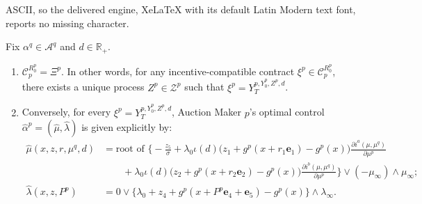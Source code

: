 \documentclass[10pt,a4paper]{amsart}
\begin{document}
ASCII, so the delivered engine, XeLaTeX with its default Latin Modern text font, reports no missing character.
\begin{lemma} \label{lemma:trader}
Fix $\alpha^q \in \mathcal{A}^q$ and $d \in \mathbb{R}_+$.

\begin{enumerate}
    \item $\mathcal{C}^{R_0^p}_p = \Xi^p$. In other words, for any incentive-compatible contract $\xi^p \in \mathcal{C}^{R_0^p}_p$, there exists a unique process $Z^p \in \mathcal{Z}^p$ such that $\xi^p = Y_T^{p,Y_0^p,Z^p,d}$.
    \item Conversely, for every $\xi^p = Y_T^{p,Y_0^p,Z^p,d}$, Auction Maker $p$'s optimal control $\hat{\alpha}^p = (\hat{\mu}, \hat{\lambda})$ is given explicitly by:
    \begin{align*}
        \hat{\mu}(x,z,r,\mu^{q},d) &= \text{root of } \Bigg\{ -\frac{z_5}{\sigma} + \lambda_0 \iota(d) \big(z_1 + g^p(x + r_1\mathbf{e}_1) - g^p(x) \big) \frac{\partial i^a(\mu,\mu^{q})}{\partial \mu^p} \\
        &\quad\quad + \lambda_0 \iota(d) \big(z_2 + g^p(x + r_2\mathbf{e}_2) - g^p(x) \big) \frac{\partial i^b(\mu,\mu^{q})}{\partial \mu^p} \Bigg\} \vee (-\mu_{\infty}) \wedge \mu_{\infty}; \\
        \hat{\lambda}(x,z,P^p) &= 0 \vee \Big\{ \lambda_0 + z_4 + g^p(x + P^p\mathbf{e}_4 + \mathbf{e}_5) - g^p(x) \Big\} \wedge \lambda_{\infty}.
    \end{align*}
\end{enumerate} 
\end{lemma}
\end{document}
